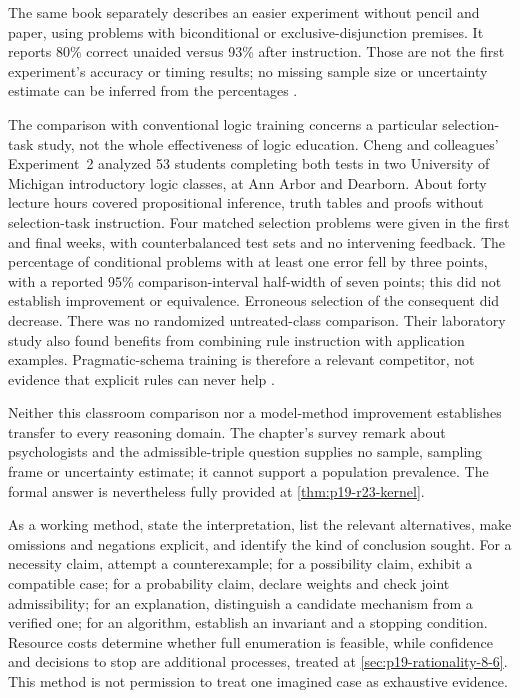 The same book separately describes an easier experiment without pencil
and paper, using problems with biconditional or exclusive-disjunction
premises. It reports 80\% correct unaided versus 93\% after instruction.
Those are not the first experiment's accuracy or timing results; no
missing sample size or uncertainty estimate can be inferred from the
percentages \cite[p.~290]{JohnsonLaird2006HowWeReason}.

The comparison with conventional logic training concerns a particular
selection-task study, not the whole effectiveness of logic education. Cheng and
colleagues' Experiment~2 analyzed 53 students completing both tests in
two University of Michigan introductory logic classes, at Ann Arbor
and Dearborn. About forty lecture hours covered propositional inference,
truth tables and proofs without selection-task instruction. Four matched
selection problems were given in the first and final weeks, with
counterbalanced test sets and no intervening feedback. The percentage
of conditional problems with at least one error fell by three points,
with a reported 95\% comparison-interval half-width of seven points;
this did not establish improvement or equivalence. Erroneous selection
of the consequent did decrease. There was no randomized untreated-class
comparison. Their laboratory study also found benefits from combining
rule instruction with application examples. Pragmatic-schema training
is therefore a relevant competitor, not evidence that explicit rules
can never help \cite[pp.~306--309]{ChengEtAl1986Training}.

Neither this classroom comparison nor a model-method improvement
establishes transfer to every reasoning domain. The chapter's survey
remark about psychologists and
the admissible-triple question supplies no sample, sampling frame or
uncertainty estimate; it cannot support a population prevalence. The
formal answer is nevertheless fully provided at
\cref{thm:p19-r23-kernel}.

As a working method, state the interpretation, list the relevant
alternatives, make omissions and negations explicit, and identify the
kind of conclusion sought. For a necessity claim, attempt a
counterexample; for a possibility claim, exhibit a compatible case; for
a probability claim, declare weights and check joint admissibility; for
an explanation, distinguish a candidate mechanism from a verified one;
for an algorithm, establish an invariant and a stopping condition.
Resource costs determine whether full enumeration is feasible, while
confidence and decisions to stop are additional processes, treated at
\cref{sec:p19-rationality-8-6}. This method is not permission to treat
one imagined case as exhaustive evidence.

